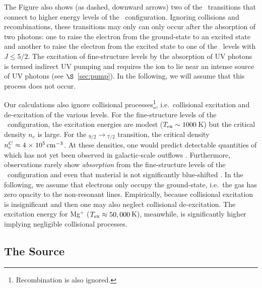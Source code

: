 \documentclass[12pt,preprint]{aastex}
\begin{document}
The Figure also shows (as dashed, downward arrows) two of the
\feiis\ transitions that connect to higher energy levels of the \zconfig\
configuration.  Ignoring collisions and recombinations, these
transitions may only can only occur after the absorption
of two photons: one to raise the electron from the ground-state to an
excited state and another to raise the electron from the excited state
to one of the \zconfig\ levels with $J \le 5/2$.  The excitation of
fine-structure levels by 
the absorption of UV photons is termed indirect UV pumping
\citep[e.g][]{silva02,pcb06} and requires the ion to lie
near an intense source of UV photons (see $\S$~\ref{sec:pump}).  In the
following, we will assume that this process does not occur. 

Our calculations also ignore collisional
processes\footnote{Recombination is also ignored.}, i.e.\ collisional
excitation and de-excitation of the various levels.  For the
fine-structure levels of the \aconfig\ configuration, the excitation
energies are modest ($T_{\rm ex} \sim 1000$\,K) but the critical
density $n_c$ is large.  For the \aconfig$_{9/2} \to
$\aconfig$_{7/2}$ transition, the critical density $n_e^C \approx 4
{\; \times \; 10^{5}} \, {\rm cm^{-3}}$.  At these densities, one would predict  
detectable quantities of  which has not yet been observed
in galactic-scale outflows
\citep[see also][]{pcb06}.  Furthermore, observations rarely show
{\it absorption} from the
fine-structure levels of the \aconfig\ configuration and even that material
is not significantly blue-shifted \citep{rubin+10}.
In the following, we assume that electrons only occupy the
ground-state, i.e.\ the gas has zero opacity to the non-resonant
lines.
Empirically, because collisional excitation is insignificant and
then one may also neglect collisional de-excitation.  
The excitation energy for Mg$^+$ ($T_{\rm ex} \approx 50,000$\,K),  
meanwhile, is significantly higher implying 
negligible collisional processes.

\subsection{The Source}
\end{document}
